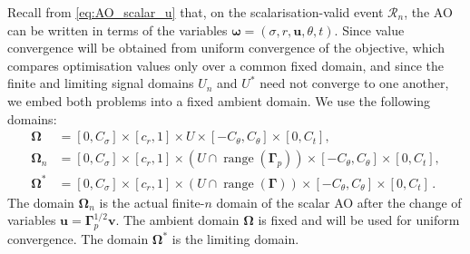 \documentclass{article}
\theoremstyle{definition}
\newcommand*{\bb}{\boldsymbol}
\def\bu{\bb{u}}
\def\bv{\bb{v}}
\newcommand{\range}{\operatorname{range}}
\begin{document}
\begin{bibunit}
Recall from \eqref{eq:AO_scalar_u} that, on the scalarisation-valid
event $\mathcal R_n$, the AO can be written in terms of the variables $\bb\omega=(\sigma,r,\bu,\theta,t)$.
Since value convergence will be obtained from uniform convergence of the
objective, which compares optimisation values only over a common fixed
domain, and since the finite and limiting signal domains $U_n$ and $U^*$
need not converge to one another, we embed
both problems into a fixed ambient domain.
We use the following domains:
\begin{equation}
	\label{eq:Omegas}
	\begin{aligned}
		\bb\Omega
		&=
		[0,C_\sigma]\times[c_r,1]\times U
		\times[-C_\theta,C_\theta]\times[0,C_t],\\
		\bb\Omega_n
		&=
		[0,C_\sigma]\times[c_r,1]\times
		\left(U\cap\range(\bb\Gamma_p)\right)
		\times[-C_\theta,C_\theta]\times[0,C_t],\\
		\bb\Omega^*
		&=
		[0,C_\sigma]\times[c_r,1]\times
		\left(U\cap\range(\bb\Gamma)\right)
		\times[-C_\theta,C_\theta]\times[0,C_t]\,.
	\end{aligned}
\end{equation}
The domain $\bb\Omega_n$ is the actual finite-$n$ domain of the scalar AO after the change of variables $\bu=\bb\Gamma_p^{1/2}\bv$.
The ambient domain $\bb\Omega$ is fixed and will be used for uniform convergence.
The domain $\bb\Omega^*$ is the limiting domain.


\end{bibunit}
\end{document}

